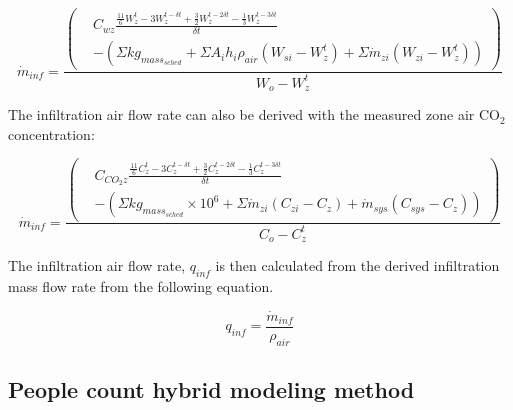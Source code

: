 \documentclass[11pt]{article}
\begin{document}
\begin{equation}
\dot{m}_{inf} = \frac{\left(\begin{aligned}& C_{wz}\frac {\frac{11}{6}W_{z}^{t}-3W_{z}^{t-\delta t}+\frac{3}{2}W_{z}^{t-2\delta t}-\frac{1}{3}W_{z}^{t-3\delta t}} {\delta t}\\ & - \left(\Sigma{kg_{mass_{sched}}} + \Sigma{A_i h_i \rho_{air} (W_{si} - W_{z}^{t})} + \Sigma{\dot{m}_{zi} (W_{zi}-W_{z}^{t})}\right)\end{aligned}\right)} {W_o - W_{z}^{t}}
\end{equation}

The infiltration air flow rate can also be derived with the measured zone air CO$_2$ concentration:

\begin{equation}
\dot{m}_{inf} = \frac{\left(\begin{aligned}& C_{CO_{2}z}\frac {\frac{11}{6}C_{z}^{t}-3C_{z}^{t-\delta t}+\frac{3}{2}C_{z}^{t-2\delta t}-\frac{1}{3}C_{z}^{t-3\delta t}} {\delta t}\\ & - \left(\Sigma{kg_{mass_{sched}}}\times 10^{6} + \Sigma{\dot{m}_{zi}(C_{zi}-C_z)} + \dot{m}_{sys} (C_{sys} - C_z)\right)\end{aligned}\right)} {C_o - C_{z}^{t}}
\end{equation}


The infiltration air flow rate, $q_{inf}$ is then calculated from the derived infiltration mass flow rate from the following equation.

\begin{equation}
q_{inf}= \frac {\dot{m}_{inf}} {ρ_{air}}
\end{equation}



\subsection{People count hybrid modeling method}\label{People count hybrid modeling method}
\end{document}
